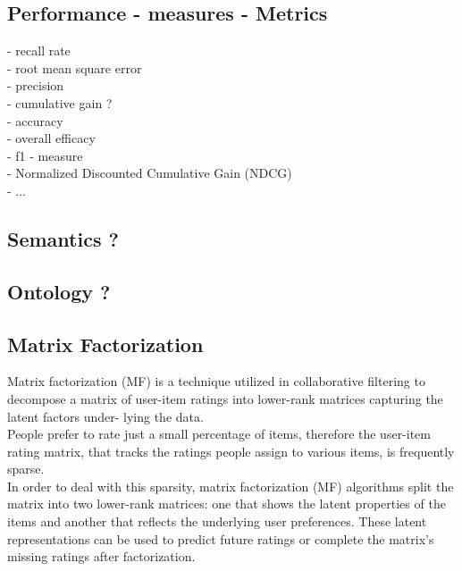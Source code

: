 \documentclass[10pt,oneside,english,a4paper]{article}
\begin{document}
\clearpage
\subsection{Performance - measures - Metrics}
- recall rate\\
- root mean square error\\
- precision\\
- cumulative gain ?\\
- accuracy\\
- overall efficacy\\
- f1 - measure\\
- Normalized Discounted Cumulative Gain (NDCG)\\
- ...\\


\clearpage
\subsection{Semantics ?}

\subsection{Ontology ?}

\subsection{Matrix Factorization}
Matrix factorization (MF) is a technique utilized in collaborative filtering to decompose
a matrix of user-item ratings into lower-rank matrices capturing the latent factors under-
lying the data\cite{Tokala2023}.\\
People prefer to rate just a small percentage of items, therefore the user-item rating matrix, that tracks the ratings people assign to various items, is frequently sparse.\\
In order to deal with this sparsity, matrix factorization (MF) algorithms split the matrix into two lower-rank matrices: one that shows the latent properties of the items and another that reflects the underlying user preferences. These latent representations can be used to predict future ratings or complete the matrix's missing ratings after factorization.
\end{document}
